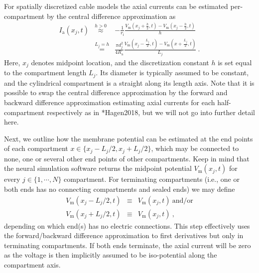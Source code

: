 For spatially discretized cable models the axial currents can be estimated per-compartment by the central difference approximation as
%
\begin{eqnarray}
I_\text{a}(x_j, t) &\overset{h>0}{\approx}& - \frac{1}{r_\text{i}} \frac{V_\text{m}(x_j+\frac{h}{2}, t) - V_\text{m}(x_j-\frac{h}{2}, t)}{h} \nonumber \\
		  &\overset{L_j=h}{=}& \frac{\pi d_j^2}{4 R_\text{a}} \frac{V_\text{m}(x_j - \frac{L_j}{2}, t) - V_\text{m}(x + \frac{L_j}{2}, t)}{L_j} ~.
\label{eq:LFPy_ia_discrete}
\end{eqnarray}
%
Here, $x_j$ denotes midpoint location,
and the discretization constant $h$ is set equal to the compartment length $L_j$.
Its diameter is typically assumed to be constant,
and the cylindrical compartment is a straight along its length axis.
Note that it is possible to swap the central difference approximation
by the forward and  backward difference approximation estimating axial currents for each half-compartment respectively as in \citeasnoun**{Hagen2018},
but we will not go into further detail here. 


Next, we outline how the membrane potential can be estimated at the end points of each compartment $x \in \{x_j-L_j/2, x_j+L_j/2\}$,
which may be connected to none, one or several other end points of other compartments. 
Keep in mind that the neural simulation software returns the midpoint potential $V_\text{m}(x_j, t)$ for every $j \in \{1, \cdots, N \}$ compartment. 
For terminating compartments (i.e., one or both ends has no connecting compartments and sealed ends) we may define
%
\begin{eqnarray}
V_\text{m}(x_j - L_j/2, t) &\equiv& V_\text{m}(x_j, t)~\text{and/or} \nonumber \\
V_\text{m}(x_j + L_j/2, t) &\equiv& V_\text{m}(x_j, t)~, \nonumber
\end{eqnarray}
%
depending on which end(s) has no electric connections. This step effectively uses the forward/backward difference approximation to first derivatives but only in terminating compartments. 
If both ends terminate, the axial current will be zero as the voltage is then implicitly assumed to be iso-potential along the compartment axis.

